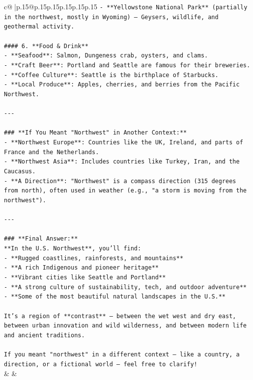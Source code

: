 \documentclass{article}
\begin{document}
{\begin{supertabular}{c@{$\;$}|p{.15\linewidth}@{}p{.15\linewidth}p{.15\linewidth}p{.15\linewidth}p{.15\linewidth}p{.15\linewidth}}
{{{\texttt{{-} **Yellowstone National Park** (partially in the northwest, mostly in Wyoming) – Geysers, wildlife, and geothermal activity.} \\
\\ 
\texttt{\#\#\#\# 6. **Food \& Drink**} \\
\texttt{{-} **Seafood**: Salmon, Dungeness crab, oysters, and clams.} \\
\texttt{{-} **Craft Beer**: Portland and Seattle are famous for their breweries.} \\
\texttt{{-} **Coffee Culture**: Seattle is the birthplace of Starbucks.} \\
\texttt{{-} **Local Produce**: Apples, cherries, and berries from the Pacific Northwest.} \\
\\ 
\texttt{{-}{-}{-}} \\
\\ 
\texttt{\#\#\# **If You Meant "Northwest" in Another Context:**} \\
\texttt{{-} **Northwest Europe**: Countries like the UK, Ireland, and parts of France and the Netherlands.} \\
\texttt{{-} **Northwest Asia**: Includes countries like Turkey, Iran, and the Caucasus.} \\
\texttt{{-} **A Direction**: "Northwest" is a compass direction (315 degrees from north), often used in weather (e.g., "a storm is moving from the northwest").} \\
\\ 
\texttt{{-}{-}{-}} \\
\\ 
\texttt{\#\#\# **Final Answer:**} \\
\texttt{**In the U.S. Northwest**, you’ll find:} \\
\texttt{{-} **Rugged coastlines, rainforests, and mountains**  } \\
\texttt{{-} **A rich Indigenous and pioneer heritage**  } \\
\texttt{{-} **Vibrant cities like Seattle and Portland**  } \\
\texttt{{-} **A strong culture of sustainability, tech, and outdoor adventure**  } \\
\texttt{{-} **Some of the most beautiful natural landscapes in the U.S.**} \\
\\ 
\texttt{It’s a region of **contrast** — between the wet west and dry east, between urban innovation and wild wilderness, and between modern life and ancient traditions.} \\
\\ 
\texttt{If you meant "northwest" in a different context — like a country, a direction, or a fictional world — feel free to clarify!} \\
            }
        }
    }
    & & \\ \\


\end{supertabular}}
\end{document}
